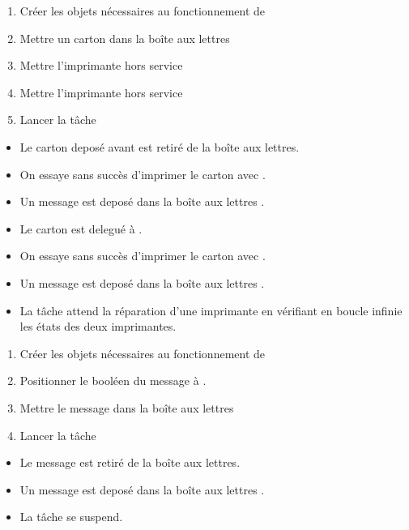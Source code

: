 {
\begin{enumerate}
	\item Créer les objets nécessaires au fonctionnement de 
	\item Mettre un carton dans la boîte aux lettres 
	\item Mettre l'imprimante  hors service
	\item Mettre l'imprimante  hors service 
	\item Lancer la tâche 
\end{enumerate}
}
{
\begin{itemize}
	\item Le carton deposé avant est retiré de la boîte aux lettres.
	\item On essaye sans succès d'imprimer le carton avec .
	\item Un message  est deposé dans la boîte aux lettres .
	\item Le carton est delegué à .
	\item On essaye sans succès d'imprimer le carton avec .
	\item Un message  est deposé dans la boîte aux lettres .
	\item La tâche attend la réparation d'une imprimante en vérifiant en boucle infinie les états des deux imprimantes.
\end{itemize}
}

{
\begin{enumerate}
	\item Créer les objets nécessaires au fonctionnement de 
	\item Positionner le booléen  du message à .
	\item Mettre le message dans la boîte aux lettres 
	\item Lancer la tâche 
\end{enumerate}
}
{
\begin{itemize}
	\item Le message est retiré de la boîte aux lettres.
	\item Un message  est deposé dans la boîte aux lettres . 
	\item La tâche se suspend.
\end{itemize}
}







